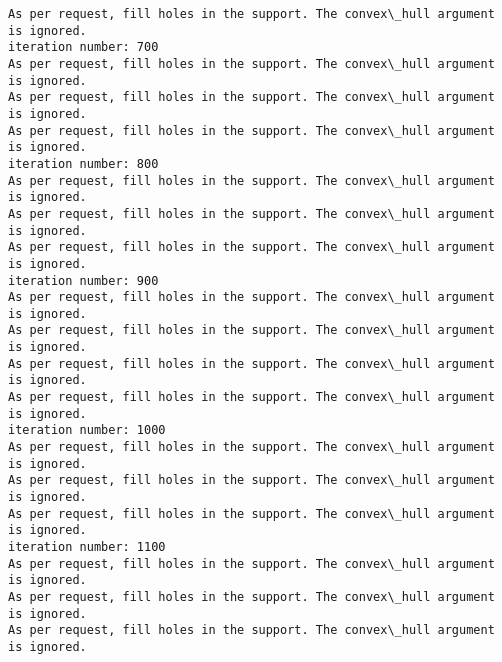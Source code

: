 \documentclass[11pt]{article}
\begin{document}
\begin{Verbatim}[commandchars=\\\{\}]
As per request, fill holes in the support. The convex\_hull argument is ignored.
iteration number: 700
As per request, fill holes in the support. The convex\_hull argument is ignored.
As per request, fill holes in the support. The convex\_hull argument is ignored.
As per request, fill holes in the support. The convex\_hull argument is ignored.
iteration number: 800
As per request, fill holes in the support. The convex\_hull argument is ignored.
As per request, fill holes in the support. The convex\_hull argument is ignored.
As per request, fill holes in the support. The convex\_hull argument is ignored.
iteration number: 900
As per request, fill holes in the support. The convex\_hull argument is ignored.
As per request, fill holes in the support. The convex\_hull argument is ignored.
As per request, fill holes in the support. The convex\_hull argument is ignored.
As per request, fill holes in the support. The convex\_hull argument is ignored.
iteration number: 1000
As per request, fill holes in the support. The convex\_hull argument is ignored.
As per request, fill holes in the support. The convex\_hull argument is ignored.
As per request, fill holes in the support. The convex\_hull argument is ignored.
iteration number: 1100
As per request, fill holes in the support. The convex\_hull argument is ignored.
As per request, fill holes in the support. The convex\_hull argument is ignored.
As per request, fill holes in the support. The convex\_hull argument is ignored.

    \end{Verbatim}
\end{document}
